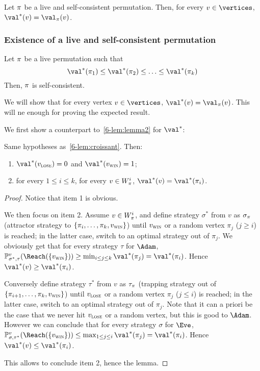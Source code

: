 \begin{corollary}
\label{6-cor:live_self-consistent_value}
Let $\pi$ be a live and self-consistent permutation. Then, for
every $v \in \vertices$, $\val^*(v) = \val_\perm(v)$.  
\end{corollary}

\subsubsection{Existence of a live and self-consistent permutation}

\begin{lemma}
\label{6-lem:live_non-dec_self-consistent}
Let $\pi$ be a live permutation such that
\[
\val^*(\perm_1) \le \val^*(\perm_2) \le \ldots \le \val^*(\perm_k)
\]
Then, $\pi$ is self-consistent.
\end{lemma}

We will show that for every vertex $v \in \vertices$, $\val^*(v) =
\val_\perm(v)$. This will ne enough for proving the expected result.

We first show a counterpart to~\cref{6-lem:lemma2} for
$\val^*$:
\begin{lemma}
Same hypotheses as~\cref{6-lem:croissant}. Then:
\begin{enumerate}
\item $\val^*(\vlose) = 0$ and $\val^*(\vwin) = 1$;
\item for every $1 \le i \le k$, for every $v \in W_\pi^i$,
  $\val^*(v) = \val^*(\perm_i)$.
\end{enumerate}
\end{lemma}

\begin{proof}
Notice that item 1 is obvious. 

We then focus on item 2.  Assume $v \in W_\pi^i$, and define
strategy $\sigma^*$ from $v$ as $\sigma_\pi$ (attractor strategy
to $\{\pi_i,\ldots,\pi_k,v_{\textsc{win}}\}$) until $v_{\textsc{win}}$ or a random
vertex $\pi_j$ ($j \ge i$) is reached; in the latter case, switch
to an optimal strategy out of $\pi_j$. We obviously get that for
every strategy $\tau$ for $\Adam$,
$\probm_{\sigma^*,\tau}^v(\Reach(\{\vwin\})) \ge \min_{i \le j \le
  k}\val^*(\perm_j) = \val^*(\perm_i)$. Hence $\val^*(v) \ge
\val^*(\perm_i)$.

Conversely define strategy $\tau^*$ from $v$ as $\tau_\pi$
(trapping strategy out of $\{\pi_{i+1},\ldots,\pi_k,v_{\textsc{win}}\}$)
until $v_{\textsc{lose}}$ or a random vertex $\pi_j$ ($j \le i$) is reached;
in the latter case, switch to an optimal strategy out of
$\pi_j$. Note that it can a priori be the case that we never hit
$v_{\textsc{lose}}$ or a random vertex, but this is good to $\Adam$. However we
can conclude that for every strategy $\sigma$ for $\Eve$,
$\probm_{\sigma,\tau^*}^v(\Reach(\{\vwin\})) \le \max_{1 \le j \le
  i}\val^*(\perm_j) = \val^*(\perm_i)$. Hence
$\val^*(v) \le \val^*(\perm_i)$.

This allows to conclude item 2, hence the lemma.
\end{proof}

